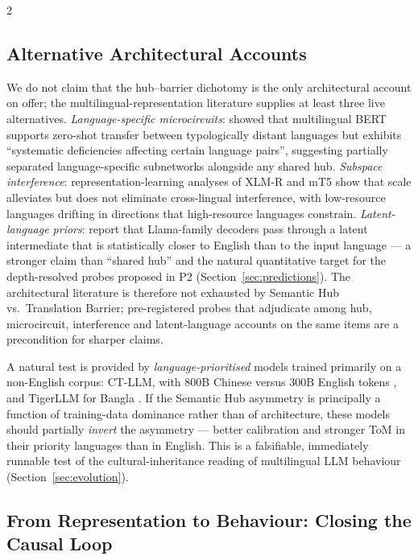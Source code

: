 \documentclass[openacc]{rsproca_new}
\begin{document}
\begin{multicols}{2}
\subsection{Alternative Architectural Accounts}\label{sec:alternatives}

We do not claim that the hub--barrier dichotomy is the only architectural account on offer; the multilingual-representation literature supplies at least three live alternatives. \emph{Language-specific microcircuits}: \citeauthor{pires2019multilingualbert} \cite{pires2019multilingualbert} showed that multilingual BERT supports zero-shot transfer between typologically distant languages but exhibits ``systematic deficiencies affecting certain language pairs'', suggesting partially separated language-specific subnetworks alongside any shared hub. \emph{Subspace interference}: representation-learning analyses of XLM-R \cite{conneau2020xlmr} and mT5 \cite{xue2021mt5} show that scale alleviates but does not eliminate cross-lingual interference, with low-resource languages drifting in directions that high-resource languages constrain. \emph{Latent-language priors}: \citeauthor{wendler2024llamasenglish} \cite{wendler2024llamasenglish} report that Llama-family decoders pass through a latent intermediate that is statistically closer to English than to the input language --- a stronger claim than ``shared hub'' and the natural quantitative target for the depth-resolved probes proposed in P2 (Section~\ref{sec:predictions}). The architectural literature is therefore not exhausted by Semantic Hub vs.\ Translation Barrier; pre-registered probes that adjudicate among hub, microcircuit, interference and latent-language accounts on the same items are a precondition for sharper claims.

A natural test is provided by \emph{language-prioritised} models trained primarily on a non-English corpus: CT-LLM, with $800$B Chinese versus $300$B English tokens \cite{du2024ctllm}, and TigerLLM for Bangla \cite{raihan2025tigerllm}. If the Semantic Hub asymmetry is principally a function of training-data dominance rather than of architecture, these models should partially \emph{invert} the asymmetry --- better calibration and stronger ToM in their priority languages than in English. This is a falsifiable, immediately runnable test of the cultural-inheritance reading of multilingual LLM behaviour (Section~\ref{sec:evolution}).

\subsection{From Representation to Behaviour: Closing the Causal Loop}\label{sec:repbehavior}


\end{multicols}
\end{document}
